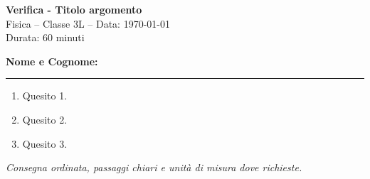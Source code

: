 \documentclass[12pt,a4paper]{article}
\newcommand{\Materia}{Fisica}
\newcommand{\Classe}{3L}
\newcommand{\Data}{\today}
\newcommand{\Titolo}{Verifica - Titolo argomento}
\newcommand{\Durata}{60 minuti}
\begin{document}
\begin{center}
    {\Large \textbf{\Titolo}}\\[0.4em]
    \Materia{} -- Classe \Classe{} -- Data: \Data{}\\
    Durata: \Durata{}
\end{center}

\vspace{1em}
\noindent\textbf{Nome e Cognome:} \rule{0.65\linewidth}{0.4pt}

\vspace{1.2em}
\begin{enumerate}[leftmargin=*]
    \item Quesito 1.
    \item Quesito 2.
    \item Quesito 3.
\end{enumerate}

\vfill
\noindent\textit{Consegna ordinata, passaggi chiari e unità di misura dove richieste.}
\end{document}
